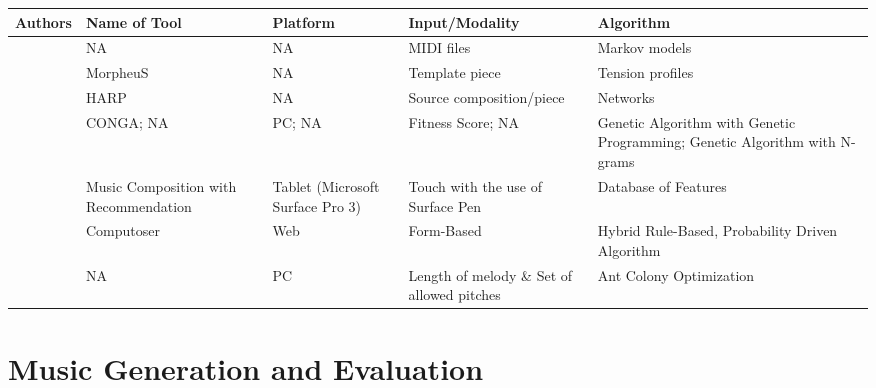\begin{landscape} %
\begin{table} [!htbp]  
\label{tab:rsomcrtas}        
   \vspace{0.20cm}    
        \begin{tabular}{|p{3cm}|p{4cm}|p{3cm}| p{5cm} | p{5cm}| } %
        \hline 
       Authors & Name of Tool & Platform & Input/Modality & Algorithm \\ \hline
       
       \citet{ames1989markov,eigenfeldt2010realtime} & NA & NA & MIDI files & Markov models \\ \hline
      
       \citet{herremans2016morpheus} & MorpheuS & NA & Template piece & Tension profiles \\ \hline
       
       \citet{camurri1991harp} & HARP & NA & Source composition/piece & Networks\\ \hline
       
       \citet{tokui2000music, kikuchi2014automatic} & CONGA; NA & PC; NA & Fitness Score; NA & Genetic Algorithm with Genetic Programming; Genetic Algorithm with N-grams\\
        \hline
        
        \citet{kikuchi2016music} & Music Composition with Recommendation & Tablet (Microsoft Surface Pro 3) & Touch with the use of Surface Pen & Database of Features \\ \hline
        
        \citet{bozhanov2014computoser} & Computoser & Web & Form-Based & Hybrid Rule-Based, Probability Driven Algorithm \\
        \hline
        
        \citet{geis2008creating} & NA & PC & Length of melody \& Set of allowed pitches & Ant Colony Optimization \\
        \hline
      
        \end{tabular}
\end{table}
\end{landscape}

\section{Music Generation and Evaluation}

